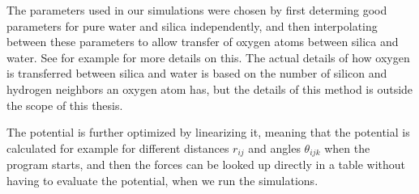 The parameters used in our simulations were chosen by first determing good parameters for pure water and silica independently, and then interpolating between these parameters to allow transfer of oxygen atoms between silica and water. See for example \cite{vashishta1990interaction} for more details on this. The actual details of how oxygen is transferred between silica and water is based on the number of silicon and hydrogen neighbors an oxygen atom has, but the details of this method is outside the scope of this thesis.

The potential is further optimized by linearizing it, meaning that the potential is calculated for example for different distances $r_{ij}$ and angles $\theta_{ijk}$ when the program starts, and then the forces can be looked up directly in a table without having to evaluate the potential, when we run the simulations.

